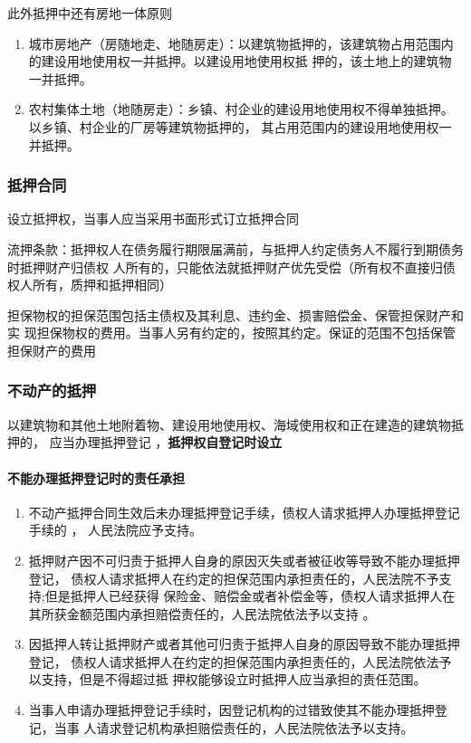 \documentclass[UTF8,12pt]{ctexart}
\numberwithin{equation}{section} %
\numberwithin{figure}{section}
\numberwithin{table}{section}
\begin{document}
	此外抵押中还有房地一体原则
	\begin{enumerate}
		\item 城市房地产（房随地走、地随房走）：以建筑物抵押的，该建筑物占用范围内的建设用地使用权一并抵押。以建设用地使用权抵 押的，该土地上的建筑物一并抵押。
		
		\item 农村集体土地（地随房走）：乡镇、村企业的建设用地使用权不得单独抵押。以乡镇、村企业的厂房等建筑物抵押的， 其占用范围内的建设用地使用权一并抵押。
	\end{enumerate}
	
	
	\subsubsection{抵押合同}
	设立抵押权，当事人应当采用书面形式订立抵押合同
	
	流押条款：抵押权人在债务履行期限届满前，与抵押人约定债务人不履行到期债务时抵押财产归债权 人所有的，只能依法就抵押财产优先受偿（所有权不直接归债权人所有，质押和抵押相同）
	
	担保物权的担保范围包括主债权及其利息、违约金、损害赔偿金、保管担保财产和实 现担保物权的费用。当事人另有约定的，按照其约定。保证的范围不包括保管担保财产的费用
	
	\subsubsection{不动产的抵押}
	以建筑物和其他土地附着物、建设用地使用权、海域使用权和正在建造的建筑物抵押的， 应当办理抵押登记 ，\textbf{抵押权自登记时设立} 
	
	\paragraph{不能办理抵押登记时的责任承担}
	\begin{enumerate}
		\item  不动产抵押合同生效后未办理抵押登记手续，债权人请求抵押人办理抵押登记手续的 ， 人民法院应予支持。
		
		\item 抵押财产因不可归责于抵押人自身的原因灭失或者被征收等导致不能办理抵押登记， 债权人请求抵押人在约定的担保范围内承担责任的，人民法院不予支持;但是抵押人已经获得 保险金、赔偿金或者补偿金等，债权人请求抵押人在其所获金额范围内承担赔偿责任的，人民法院依法予以支持 。
		
		\item 因抵押人转让抵押财产或者其他可归责于抵押人自身的原因导致不能办理抵押登记， 债权人请求抵押人在约定的担保范围内承担责任的，人民法院依法予以支持，但是不得超过抵 押权能够设立时抵押人应当承担的责任范围。
		
		\item 当事人申请办理抵押登记手续时，因登记机构的过错致使其不能办理抵押登记，当事 人请求登记机构承担赔偿责任的，人民法院依法予以支持。
	\end{enumerate}
	
\end{document}

